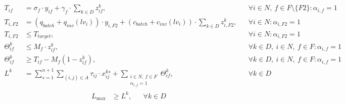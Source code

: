 \documentclass{article}
\begin{document}
\begin{align}
    T_{if} &= \sigma_f \cdot y_{if} + \gamma_f \cdot \sum_{k \in D} z_{if}^k, && \forall i \in N,\ f \in F \setminus \{F2\} : \alpha_{i,f}=1 \label{proctime_other} \\[4pt]
    T_{i,F2} &= \left(q_{batch} + q_{inv}(lv_i)\right) \cdot y_{i,F2} + \left(c_{batch} + c_{inv}(lv_i)\right) \cdot \sum_{k \in D} z_{i,F2}^k, && \forall i \in N : \alpha_{i,F2}=1 \label{proctime_F2} \\[4pt]
    T_{i,F2} &\leq T_{target}, && \forall i \in N : \alpha_{i,F2}=1 \label{trainingtarget} \\[4pt]
    \Theta_{if}^k &\leq M_f \cdot z_{if}^k, && \forall k \in D,\ i \in N,\ f \in F : \alpha_{i,f}=1 \label{theta1} \\[4pt]
    \Theta_{if}^k &\geq T_{if} - M_f(1 - z_{if}^k), && \forall k \in D,\ i \in N,\ f \in F : \alpha_{i,f}=1 \label{theta2} \\[4pt]
    L^k &= \sum_{s=1}^{n+1} \sum_{(i,j) \in A} \tau_{ij} \cdot x_{ij}^{ks} + \sum_{\substack{i \in N,\ f \in F \\ \alpha_{i,f}=1}} \Theta_{if}^k, && \forall k \in D \label{latency}
\end{align}
\begin{align}
    L_{\max} &\geq L^k, && \forall k \in D \label{maxlatency}
\end{align}
\vspace{1em}
\end{document}
